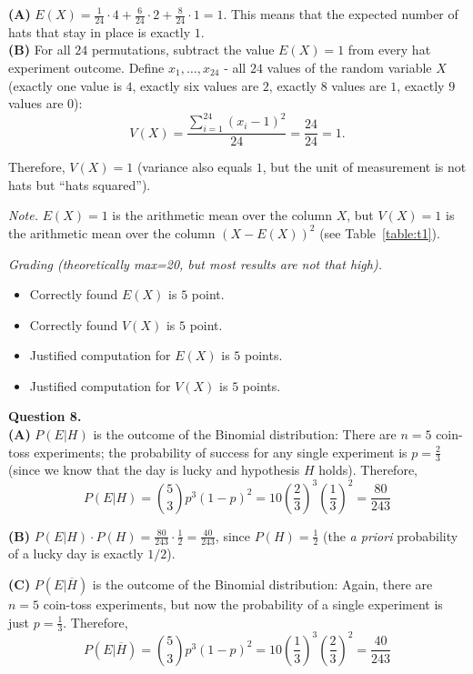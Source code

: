 \documentclass[jou]{apa6}
\begin{document}
{\bf (A)} $E(X) = \frac{1}{24} \cdot 4 + \frac{6}{24} \cdot 2 + \frac{8}{24} \cdot 1 = 1$. 
This means that the expected number of hats that stay in place is exactly $1$.\\
{\bf (B)} For all $24$ permutations, subtract the value $E(X) = 1$ from 
every hat experiment outcome. Define $x_1,\ldots,x_{24}$ - all $24$ values of the 
random variable $X$ (exactly one value is $4$, exactly six values are $2$, 
exactly $8$ values are $1$, exactly $9$ values are $0$): 
$$V(X) = \frac{\sum_{i=1}^{24} (x_i - 1)^2}{24} = \frac{24}{24} = 1.$$

Therefore, $V(X) = 1$ (variance also equals $1$, but the unit of measurement 
is not hats but ``hats squared'').

{\em Note.} $E(X)=1$ is the arithmetic mean over the column $X$, but $V(X)=1$ 
is the arithmetic mean over the column $(X-E(X))^2$ (see Table~\ref{table:t1}).

{\scriptsize
{\em Grading (theoretically max=20, but most results are not that high).} 
\begin{itemize} 
\item Correctly found $E(X)$ is $5$ point.
\item Correctly found $V(X)$ is $5$ point.
\item Justified computation for $E(X)$ is $5$ points.
\item Justified computation for $V(X)$ is $5$ points.
\end{itemize}
}




\vspace{10pt}
{\bf Question 8.} \\

{\bf (A)} $P(E|H)$ is the outcome of the Binomial distribution: 
There are $n=5$ coin-toss experiments; the probability of success for any single experiment 
is $p = \frac{2}{3}$ (since we know that the day is lucky and hypothesis $H$ holds). 
Therefore, 
$$P(E|H) = {5 \choose 3} p^3 (1-p)^2 = 10 \left( \frac{2}{3} \right)^3 \left( \frac{1}{3} \right)^2 = 
\frac{80}{243}$$

{\bf (B)} $P(E|H)\cdot P(H) = \frac{80}{243}\cdot\frac{1}{2}= \frac{40}{243}$, 
since $P(H) = \frac{1}{2}$ (the {\em a priori} probability of a lucky day is exactly $1/2$). 

{\bf (C)} $P(E|\overline{H})$ is the outcome of the Binomial distribution: 
Again, there are $n=5$ coin-toss experiments, but now the probability of a single
experiment is just $p = \frac{1}{3}$. Therefore, 
$$P(E|\overline{H}) = {5 \choose 3} p^3 (1-p)^2 = 10 \left( \frac{1}{3} \right)^3 \left( \frac{2}{3} \right)^2 = 
\frac{40}{243}$$
\end{document}
